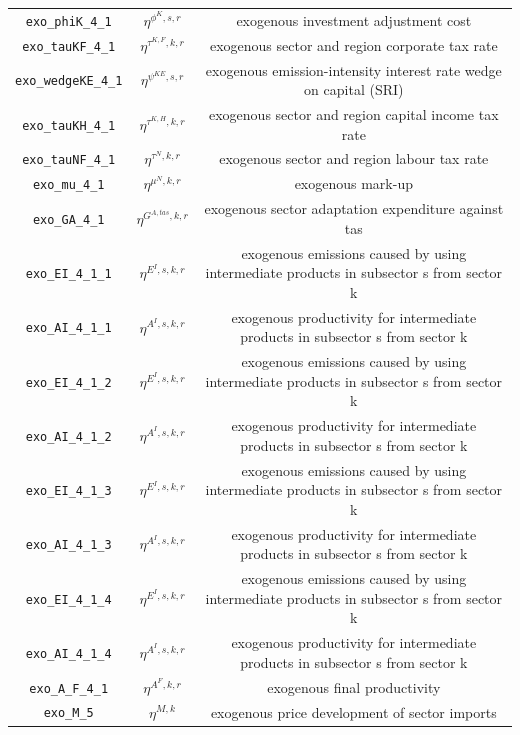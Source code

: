 \begin{center}
\begin{longtable}{ccc}
\texttt{exo\_phiK\_4\_1} & ${\eta^{\phi^{K},{s,r}}}$ & exogenous investment adjustment cost\\
\texttt{exo\_tauKF\_4\_1} & ${\eta^{\tau^{K,F},k,r}}$ & exogenous sector and region corporate tax rate\\
\texttt{exo\_wedgeKE\_4\_1} & ${\eta^{\psi^{KE},s,r}}$ & exogenous emission-intensity interest rate wedge on capital (SRI)\\
\texttt{exo\_tauKH\_4\_1} & ${\eta^{\tau^{K,H},k,r}}$ & exogenous sector and region capital income tax rate\\
\texttt{exo\_tauNF\_4\_1} & ${\eta^{\tau^{N},k,r}}$ & exogenous sector and region labour tax rate\\
\texttt{exo\_mu\_4\_1} & ${\eta^{\mu^{N},k,r}}$ & exogenous mark-up\\
\texttt{exo\_GA\_4\_1} & ${\eta^{G^{A,tas},k,r}}$ & exogenous sector adaptation expenditure against tas\\
\texttt{exo\_EI\_4\_1\_1} & ${\eta^{E^{I},s,k,r}}$ & exogenous emissions caused by using intermediate products in subsector s from sector k\\
\texttt{exo\_AI\_4\_1\_1} & ${\eta^{A^{I},s,k,r}}$ & exogenous productivity for intermediate products in subsector s from sector k\\
\texttt{exo\_EI\_4\_1\_2} & ${\eta^{E^{I},s,k,r}}$ & exogenous emissions caused by using intermediate products in subsector s from sector k\\
\texttt{exo\_AI\_4\_1\_2} & ${\eta^{A^{I},s,k,r}}$ & exogenous productivity for intermediate products in subsector s from sector k\\
\texttt{exo\_EI\_4\_1\_3} & ${\eta^{E^{I},s,k,r}}$ & exogenous emissions caused by using intermediate products in subsector s from sector k\\
\texttt{exo\_AI\_4\_1\_3} & ${\eta^{A^{I},s,k,r}}$ & exogenous productivity for intermediate products in subsector s from sector k\\
\texttt{exo\_EI\_4\_1\_4} & ${\eta^{E^{I},s,k,r}}$ & exogenous emissions caused by using intermediate products in subsector s from sector k\\
\texttt{exo\_AI\_4\_1\_4} & ${\eta^{A^{I},s,k,r}}$ & exogenous productivity for intermediate products in subsector s from sector k\\
\texttt{exo\_A\_F\_4\_1} & ${\eta^{A^F,k,r}}$ & exogenous final productivity\\
\texttt{exo\_M\_5} & ${\eta^{M,k}}$ & exogenous price development of sector imports\\

\end{longtable}
\end{center}
